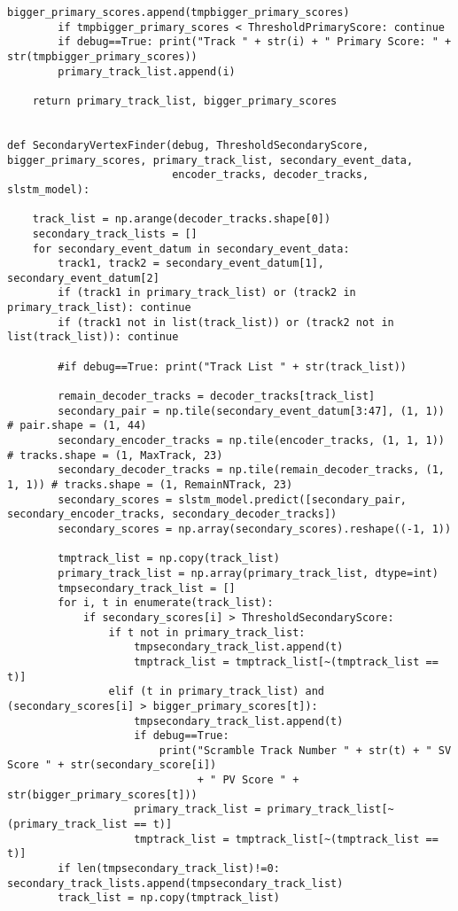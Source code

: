 \begin{lstlisting}[caption=崩壊点検出アルゴリズム用関数,label=VertexFinder1]
        bigger_primary_scores.append(tmpbigger_primary_scores)
        if tmpbigger_primary_scores < ThresholdPrimaryScore: continue
        if debug==True: print("Track " + str(i) + " Primary Score: " + str(tmpbigger_primary_scores))
        primary_track_list.append(i)

    return primary_track_list, bigger_primary_scores


def SecondaryVertexFinder(debug, ThresholdSecondaryScore, bigger_primary_scores, primary_track_list, secondary_event_data, 
                          encoder_tracks, decoder_tracks, slstm_model):

    track_list = np.arange(decoder_tracks.shape[0])
    secondary_track_lists = []
    for secondary_event_datum in secondary_event_data:
        track1, track2 = secondary_event_datum[1], secondary_event_datum[2]
        if (track1 in primary_track_list) or (track2 in primary_track_list): continue
        if (track1 not in list(track_list)) or (track2 not in list(track_list)): continue

        #if debug==True: print("Track List " + str(track_list))
        
        remain_decoder_tracks = decoder_tracks[track_list]
        secondary_pair = np.tile(secondary_event_datum[3:47], (1, 1)) # pair.shape = (1, 44)
        secondary_encoder_tracks = np.tile(encoder_tracks, (1, 1, 1)) # tracks.shape = (1, MaxTrack, 23)
        secondary_decoder_tracks = np.tile(remain_decoder_tracks, (1, 1, 1)) # tracks.shape = (1, RemainNTrack, 23)
        secondary_scores = slstm_model.predict([secondary_pair, secondary_encoder_tracks, secondary_decoder_tracks])
        secondary_scores = np.array(secondary_scores).reshape((-1, 1))

        tmptrack_list = np.copy(track_list)
        primary_track_list = np.array(primary_track_list, dtype=int)
        tmpsecondary_track_list = []
        for i, t in enumerate(track_list):
            if secondary_scores[i] > ThresholdSecondaryScore:
                if t not in primary_track_list:
                    tmpsecondary_track_list.append(t)
                    tmptrack_list = tmptrack_list[~(tmptrack_list == t)]
                elif (t in primary_track_list) and (secondary_scores[i] > bigger_primary_scores[t]):
                    tmpsecondary_track_list.append(t)
                    if debug==True:
                        print("Scramble Track Number " + str(t) + " SV Score " + str(secondary_score[i]) 
                              + " PV Score " + str(bigger_primary_scores[t]))
                    primary_track_list = primary_track_list[~(primary_track_list == t)]
                    tmptrack_list = tmptrack_list[~(tmptrack_list == t)]
        if len(tmpsecondary_track_list)!=0: secondary_track_lists.append(tmpsecondary_track_list)
        track_list = np.copy(tmptrack_list)


\end{lstlisting}

